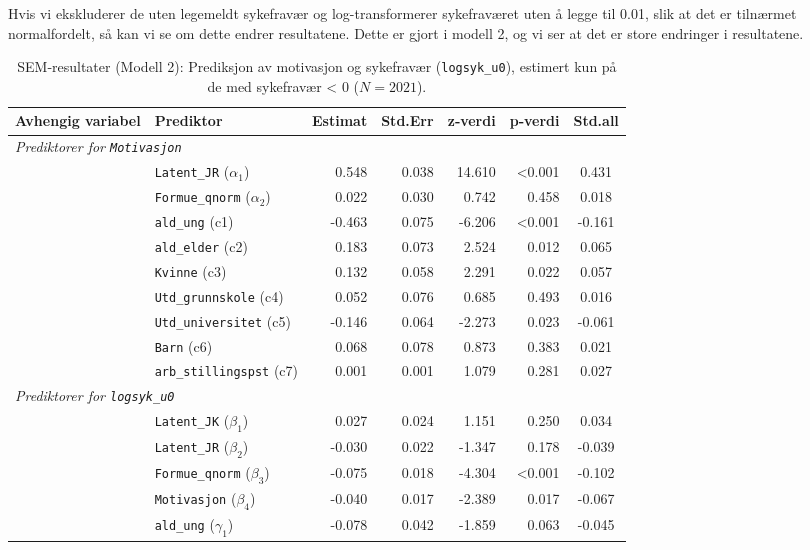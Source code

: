 \documentclass[
  12pt,
  a4paper,
  DIV=11,
  numbers=noendperiod]{scrartcl}
\begin{document}
Hvis vi ekskluderer de uten legemeldt sykefravær og log-transformerer
sykefraværet uten å legge til 0.01, slik at det er tilnærmet
normalfordelt, så kan vi se om dette endrer resultatene. Dette er gjort
i modell 2, og vi ser at det er store endringer i resultatene.

\begin{table}[htbp]
\centering
\caption{SEM‐resultater (Modell 2): Prediksjon av motivasjon og sykefravær (\texttt{logsyk\_u0}), estimert kun på de med sykefravær < 0 ($N = 2021$).}
\label{tab:sem_results_model2}
\begin{tabular}{@{}llrrrrc@{}}
\toprule
Avhengig variabel & Prediktor & Estimat & Std.Err & z‐verdi & p‐verdi & Std.all \\
\midrule
\multicolumn{7}{l}{\textit{Prediktorer for \texttt{Motivasjon}}} \\
& \texttt{Latent\_JR} ($\alpha_1$)        & 0.548 & 0.038 & 14.610 & <0.001 & 0.431 \\
& \texttt{Formue\_qnorm} ($\alpha_2$)     & 0.022 & 0.030 & 0.742  & 0.458  & 0.018 \\
& \texttt{ald\_ung} (c1)          & -0.463& 0.075 & -6.206 & <0.001 & -0.161 \\
& \texttt{ald\_elder} (c2)        & 0.183 & 0.073 & 2.524  & 0.012  & 0.065 \\
& \texttt{Kvinne} (c3)            & 0.132 & 0.058 & 2.291  & 0.022  & 0.057 \\
& \texttt{Utd\_grunnskole} (c4)   & 0.052 & 0.076 & 0.685  & 0.493  & 0.016 \\
& \texttt{Utd\_universitet} (c5)  & -0.146& 0.064 & -2.273 & 0.023  & -0.061 \\
& \texttt{Barn} (c6)              & 0.068 & 0.078 & 0.873  & 0.383  & 0.021 \\
& \texttt{arb\_stillingspst} (c7) & 0.001 & 0.001 & 1.079  & 0.281  & 0.027 \\
\midrule
\multicolumn{7}{l}{\textit{Prediktorer for \texttt{logsyk\_u0}}} \\
& \texttt{Latent\_JK} ($\beta_1$)        & 0.027 & 0.024 & 1.151  & 0.250  & 0.034 \\
& \texttt{Latent\_JR} ($\beta_2$)        & -0.030& 0.022 & -1.347 & 0.178  & -0.039 \\
& \texttt{Formue\_qnorm} ($\beta_3$)     & -0.075& 0.018 & -4.304 & <0.001 & -0.102 \\
& \texttt{Motivasjon} ($\beta_4$)        & -0.040& 0.017 & -2.389 & 0.017  & -0.067 \\
& \texttt{ald\_ung} ($\gamma_1$)          & -0.078& 0.042 & -1.859 & 0.063  & -0.045 \\

\end{tabular}
\end{table}
\end{document}
